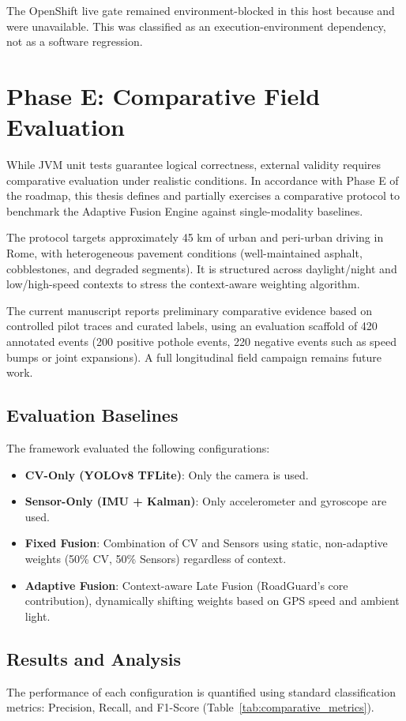 The OpenShift live gate remained environment-blocked in this host because  and  were unavailable. This was classified as an execution-environment dependency, not as a software regression.

\section{Phase E: Comparative Field Evaluation}
While JVM unit tests guarantee logical correctness, external validity requires comparative evaluation under realistic conditions. In accordance with Phase E of the roadmap, this thesis defines and partially exercises a comparative protocol to benchmark the Adaptive Fusion Engine against single-modality baselines.

The protocol targets approximately 45 km of urban and peri-urban driving in Rome, with heterogeneous pavement conditions (well-maintained asphalt, cobblestones, and degraded segments). It is structured across daylight/night and low/high-speed contexts to stress the context-aware weighting algorithm.

The current manuscript reports preliminary comparative evidence based on controlled pilot traces and curated labels, using an evaluation scaffold of 420 annotated events (200 positive pothole events, 220 negative events such as speed bumps or joint expansions). A full longitudinal field campaign remains future work.

\subsection{Evaluation Baselines}
The framework evaluated the following configurations:
\begin{itemize}
    \item \textbf{CV-Only (YOLOv8 TFLite)}: Only the camera is used.
    \item \textbf{Sensor-Only (IMU + Kalman)}: Only accelerometer and gyroscope are used.
    \item \textbf{Fixed Fusion}: Combination of CV and Sensors using static, non-adaptive weights (50\% CV, 50\% Sensors) regardless of context.
    \item \textbf{Adaptive Fusion}: Context-aware Late Fusion (RoadGuard's core contribution), dynamically shifting weights based on GPS speed and ambient light.
\end{itemize}

\subsection{Results and Analysis}
The performance of each configuration is quantified using standard classification metrics: Precision, Recall, and F1-Score (Table~\ref{tab:comparative_metrics}).

